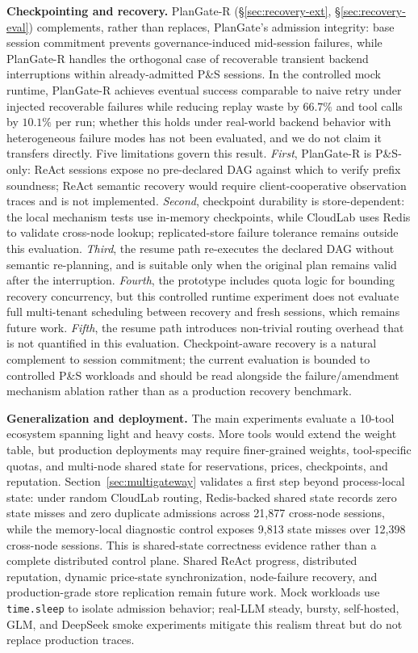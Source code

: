 \documentclass[sigconf,review,anonymous]{acmart}
\begin{document}
\textbf{Checkpointing and recovery.}
PlanGate-R (\S\ref{sec:recovery-ext}, \S\ref{sec:recovery-eval}) complements, rather than replaces, PlanGate's admission integrity: base session commitment prevents governance-induced mid-session failures, while PlanGate-R handles the orthogonal case of recoverable transient backend interruptions within already-admitted P\&S sessions.
In the controlled mock runtime, PlanGate-R achieves eventual success comparable to naive retry under injected recoverable failures while reducing replay waste by $66.7\%$ and tool calls by $10.1\%$ per run; whether this holds under real-world backend behavior with heterogeneous failure modes has not been evaluated, and we do not claim it transfers directly.
Five limitations govern this result.
\emph{First}, PlanGate-R is P\&S-only: ReAct sessions expose no pre-declared DAG against which to verify prefix soundness; ReAct semantic recovery would require client-cooperative observation traces and is not implemented.
\emph{Second}, checkpoint durability is store-dependent: the local mechanism tests use in-memory checkpoints, while CloudLab uses Redis to validate cross-node lookup; replicated-store failure tolerance remains outside this evaluation.
\emph{Third}, the resume path re-executes the declared DAG without semantic re-planning, and is suitable only when the original plan remains valid after the interruption.
\emph{Fourth}, the prototype includes quota logic for bounding recovery concurrency, but this controlled runtime experiment does not evaluate full multi-tenant scheduling between recovery and fresh sessions, which remains future work.
\emph{Fifth}, the resume path introduces non-trivial routing overhead that is not quantified in this evaluation.
Checkpoint-aware recovery is a natural complement to session commitment; the current evaluation is bounded to controlled P\&S workloads and should be read alongside the failure/amendment mechanism ablation rather than as a production recovery benchmark.

\textbf{Generalization and deployment.}
The main experiments evaluate a 10-tool ecosystem spanning light and heavy costs. More tools would extend the weight table, but production deployments may require finer-grained weights, tool-specific quotas, and multi-node shared state for reservations, prices, checkpoints, and reputation. Section~\ref{sec:multigateway} validates a first step beyond process-local state: under random CloudLab routing, Redis-backed shared state records zero state misses and zero duplicate admissions across 21,877 cross-node sessions, while the memory-local diagnostic control exposes 9,813 state misses over 12,398 cross-node sessions. This is shared-state correctness evidence rather than a complete distributed control plane. Shared ReAct progress, distributed reputation, dynamic price-state synchronization, node-failure recovery, and production-grade store replication remain future work. Mock workloads use \texttt{time.sleep} to isolate admission behavior; real-LLM steady, bursty, self-hosted, GLM, and DeepSeek smoke experiments mitigate this realism threat but do not replace production traces.
\end{document}
